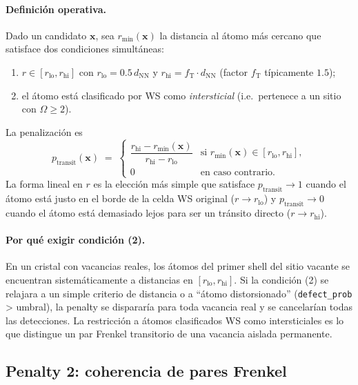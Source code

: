 \documentclass[11pt,a4paper]{article}
\theoremstyle{remark}
\begin{document}
\paragraph{Definición operativa.} Dado un candidato $\mathbf{x}$,
sea $r_\text{min}(\mathbf{x})$ la distancia al átomo más cercano que
satisface dos condiciones simultáneas:
\begin{enumerate}[label=(\arabic*)]
\item $r \in [r_\text{lo}, r_\text{hi}]$ con $r_\text{lo} = 0.5\,d_\text{NN}$
      y $r_\text{hi} = f_\text{T}\cdot d_\text{NN}$ (factor
      $f_\text{T}$ típicamente $1.5$);
\item el átomo está clasificado por WS como \emph{intersticial}
      (i.e.\ pertenece a un sitio con $\Omega \geq 2$).
\end{enumerate}
La penalización es
\begin{equation}
  p_\text{transit}(\mathbf{x}) \;=\;
  \begin{cases}
    \dfrac{r_\text{hi} - r_\text{min}(\mathbf{x})}{r_\text{hi} - r_\text{lo}}
      & \text{si } r_\text{min}(\mathbf{x}) \in [r_\text{lo}, r_\text{hi}],\\
    0 & \text{en caso contrario}.
  \end{cases}
  \label{eq:pen-transit}
\end{equation}
La forma lineal en $r$ es la elección más simple que satisface
$p_\text{transit} \to 1$ cuando el átomo está justo en el borde de la
celda WS original ($r \to r_\text{lo}$) y $p_\text{transit} \to 0$
cuando el átomo está demasiado lejos para ser un tránsito directo
($r \to r_\text{hi}$).

\paragraph{Por qué exigir condición (2).} En un cristal con vacancias
reales, los átomos del primer shell del sitio vacante se encuentran
sistemáticamente a distancias en $[r_\text{lo}, r_\text{hi}]$. Si la
condición (2) se relajara a un simple criterio de distancia o a
``átomo distorsionado'' (\texttt{defect\_prob} > umbral), la penalty
se dispararía para toda vacancia real y se cancelarían todas las
detecciones. La restricción a átomos clasificados WS como
intersticiales es lo que distingue un par Frenkel transitorio de una
vacancia aislada permanente.

\subsection{Penalty 2: coherencia de pares Frenkel}
\label{sec:pen-frenkel}
\end{document}
